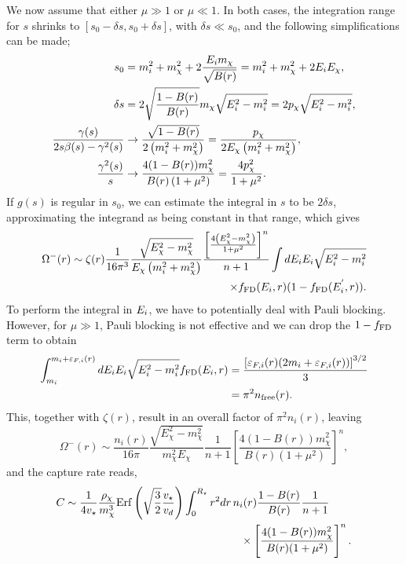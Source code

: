 We now assume that either $\mu\gg1$ or $\mu\ll1$. In both cases, the integration range for $s$ shrinks to $[s_0-\delta s, s_0+\delta s]$, with $\delta s \ll s_0$, and the following simplifications can be made;
\begin{align}
s_0 &= m_i^2+m_\chi^2 + 2\frac{E_i m_\chi}{\sqrt{B(r)}} = m_i^2+m_\chi^2 + 2E_i E_\chi,\\
\delta s &= 2\sqrt{\frac{1-B(r)}{B(r)}}m_\chi\sqrt{E_i^2-m_i^2} = 2p_\chi\sqrt{E_i^2-m_i^2}, \\ 
\frac{\gamma(s)}{2s\beta(s)-\gamma^2(s)} &\rightarrow \frac{\sqrt{1-B(r)}}{2\left(m_i^2+m_\chi^2\right)} =\frac{p_\chi}{2E_\chi\left(m_i^2+m_\chi^2\right)},\\
\frac{\gamma^2(s)}{s} &\rightarrow \frac{4(1-B(r))m_\chi^2}{B(r)\left(1+\mu^2\right)} =\frac{4p_\chi^2}{1+\mu^2}. 
\end{align}
If $g(s)$ is regular in $s_0$, we can estimate the integral in $s$ to be $  2\delta s$, approximating the integrand as being constant in that range, which gives
\begin{align}
\Omega^{-}(r) \sim \zeta(r)\frac{1}{16\pi^3} \frac{\sqrt{E_\chi^2-m_\chi^2}}{E_\chi\left(m_i^2+m_\chi^2\right)}  \frac{\left[\frac{4\left(E_\chi^2-m_\chi^2\right)}{1+\mu^2}\right]^n}{n+1}\int dE_i E_i \sqrt{E_i^2-m_i^2} \nonumber \\
\times f_{\rm FD}(E_i,r)(1-f_{\rm FD}(E_i^{'},r)). 
\end{align}
To perform the integral in $E_i$, we have to potentially deal with Pauli blocking. However, for $\mu\gg1$, Pauli blocking is not effective and we can drop the $1-f_{\rm FD}$ term to obtain
\begin{align}
 \int_{m_i}^{m_i+\varepsilon_{F,i}(r)} dE_i E_i \sqrt{E_i^2-m_i^2}  f_{\rm FD}(E_i,r) &= \frac{\left[\varepsilon_{F,i}(r)(2m_i+\varepsilon_{F,i}(r))\right]^{3/2}}{3} \\
 & = \pi^2 n_\mathrm{free}(r).
\end{align}
This, together with $\zeta(r)$, result in an overall factor of $\pi^2 n_i(r)$, leaving 
\begin{equation}
\Omega^{-}(r) \sim \frac{n_i(r)}{16\pi} \frac{\sqrt{E_\chi^2-m_\chi^2}}{   m_\chi^2 E_\chi} \frac{1}{n+1} 
\left[\frac{4(1-B(r))m_\chi^2}{B(r) (1+\mu^2)}\right]^n,   
\end{equation}
and the capture rate reads, 
\begin{equation}
    \begin{split}
        C &\sim \frac{1}{4 \vstar} \frac{\rho_\chi}{m_\chi^3}  {\rm Erf}\left(\sqrt{\frac{3}{2}}\frac{\vstar}{v_d}\right)\int_0^{\Rstar}  r^2 dr \, n_i(r)  \frac{1-B(r)}{B(r)} \frac{1}{n+1}\\
        &\hspace{16em}\times \left[\frac{4(1-B(r))m_\chi^2}{B(r) (1+\mu^2)}\right]^n.    
    \end{split}
\end{equation}
